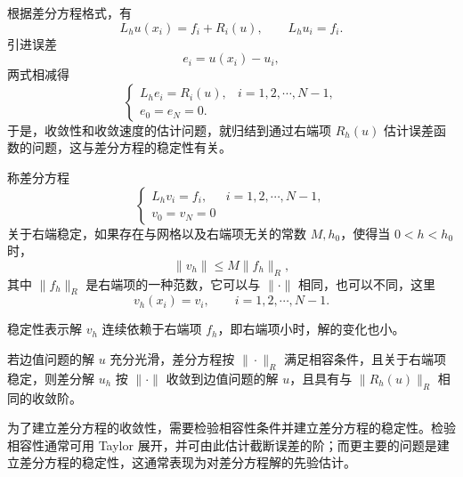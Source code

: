 \begin{note}
根据差分方程格式，有
\[
L_hu(x_i)=f_i+R_i(u),
\qquad
L_hu_i=f_i.
\]
引进误差
\[
e_i=u(x_i)-u_i,
\]
两式相减得
\[
\begin{cases}
L_he_i=R_i(u), & i=1,2,\cdots,N-1,\\
e_0=e_N=0.
\end{cases}
\]
于是，收敛性和收敛速度的估计问题，就归结到通过右端项 \(R_h(u)\) 估计误差函数的问题，这与差分方程的稳定性有关。
\end{note}
\begin{definition}[右端稳定性]
称差分方程
\[
\begin{cases}
L_h v_i = f_i, & i=1,2,\cdots,N-1,\\
v_0=v_N=0
\end{cases}
\]
关于右端稳定，如果存在与网格以及右端项无关的常数 \(M,h_0\)，使得当 \(0<h<h_0\) 时，
\[
\|v_h\|\le M\|f_h\|_R,
\]
其中 \(\|f_h\|_R\) 是右端项的一种范数，它可以与 \(\|\cdot\|\) 相同，也可以不同，这里
\[
v_h(x_i)=v_i,\qquad i=1,2,\cdots,N-1.
\]
\end{definition}

\begin{note}
稳定性表示解 \(v_h\) 连续依赖于右端项 \(f_h\)，即右端项小时，解的变化也小。
\end{note}
\begin{theorem}[相容性与稳定性推出收敛性]
若边值问题的解 \(u\) 充分光滑，差分方程按 \(\|\cdot\|_R\) 满足相容条件，且关于右端项稳定，则差分解 \(u_h\) 按 \(\|\cdot\|\) 收敛到边值问题的解 \(u\)，且具有与 \(\|R_h(u)\|_R\) 相同的收敛阶。
\end{theorem}

\begin{note}
为了建立差分方程的收敛性，需要检验相容性条件并建立差分方程的稳定性。检验相容性通常可用 Taylor 展开，并可由此估计截断误差的阶；而更主要的问题是建立差分方程的稳定性，这通常表现为对差分方程解的先验估计。
\end{note}
